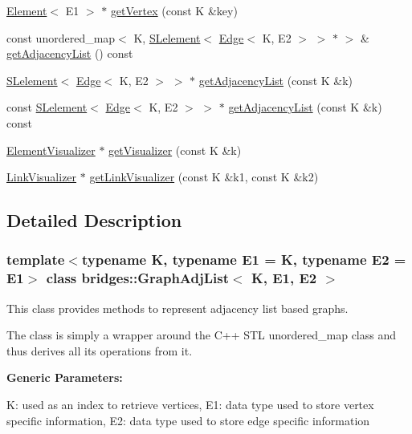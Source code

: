 \begin{DoxyCompactItemize}
\mbox{\hyperlink{classbridges_1_1_element}{Element}}$<$ E1 $>$ $\ast$ \mbox{\hyperlink{classbridges_1_1_graph_adj_list_a8ba3aefe8e118ce8d8d6fab807e494c1}{get\+Vertex}} (const K \&key)
\item 
const unordered\+\_\+map$<$ K, \mbox{\hyperlink{classbridges_1_1_s_lelement}{S\+Lelement}}$<$ \mbox{\hyperlink{classbridges_1_1_edge}{Edge}}$<$ K, E2 $>$ $>$ $\ast$ $>$ \& \mbox{\hyperlink{classbridges_1_1_graph_adj_list_ac26efd5d2e57a8b8881c57e515e80bcf}{get\+Adjacency\+List}} () const
\item 
\mbox{\hyperlink{classbridges_1_1_s_lelement}{S\+Lelement}}$<$ \mbox{\hyperlink{classbridges_1_1_edge}{Edge}}$<$ K, E2 $>$ $>$ $\ast$ \mbox{\hyperlink{classbridges_1_1_graph_adj_list_ab9eb791b7c242742ac832121f297acdc}{get\+Adjacency\+List}} (const K \&k)
\item 
const \mbox{\hyperlink{classbridges_1_1_s_lelement}{S\+Lelement}}$<$ \mbox{\hyperlink{classbridges_1_1_edge}{Edge}}$<$ K, E2 $>$ $>$ $\ast$ \mbox{\hyperlink{classbridges_1_1_graph_adj_list_a6d5af10da7c8b5ea62969be448f59c84}{get\+Adjacency\+List}} (const K \&k) const
\item 
\mbox{\hyperlink{classbridges_1_1_element_visualizer}{Element\+Visualizer}} $\ast$ \mbox{\hyperlink{classbridges_1_1_graph_adj_list_a1c2c773a13dbd1fddd55bc2642c08574}{get\+Visualizer}} (const K \&k)
\item 
\mbox{\hyperlink{classbridges_1_1_link_visualizer}{Link\+Visualizer}} $\ast$ \mbox{\hyperlink{classbridges_1_1_graph_adj_list_a6e065b1411388387ff1e4df9227ce480}{get\+Link\+Visualizer}} (const K \&k1, const K \&k2)
\end{DoxyCompactItemize}


\subsection{Detailed Description}
\subsubsection*{template$<$typename K, typename E1 = K, typename E2 = E1$>$\newline
class bridges\+::\+Graph\+Adj\+List$<$ K, E1, E2 $>$}

This class provides methods to represent adjacency list based graphs. 

The class is simply a wrapper around the C++ S\+TL unordered\+\_\+map class and thus derives all its operations from it.

{\bfseries Generic Parameters\+:} \begin{DoxyVerb}     K:  used as an index to retrieve vertices,
     E1: data type used to store vertex specific information,
     E2: data type used to store edge specific information
\end{DoxyVerb}


